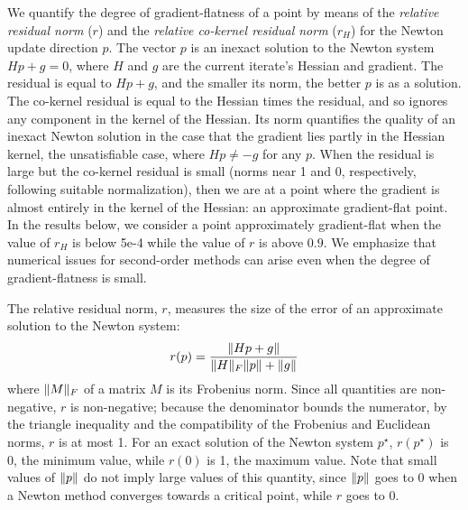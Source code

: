 \documentclass[../../thesis.tex]{subfiles}
\begin{document}
We quantify the degree of gradient-flatness of a point
by means of
the \emph{relative residual norm} ($r$)
and the \emph{relative co-kernel residual norm} ($r_H$)
for the Newton update direction $p$.
The vector $p$ is an inexact solution to the Newton system $Hp + g = 0$,
where $H$ and $g$ are the current iterate's Hessian and gradient.
The residual is equal to $Hp + g$,
and the smaller its norm, the better $p$ is as a solution.
The co-kernel residual is equal to the Hessian times the residual,
and so ignores any component in the kernel of the Hessian.
Its norm quantifies the quality of an inexact Newton solution
in the case that the gradient lies partly in the Hessian kernel,
the unsatisfiable case, where $Hp \neq -g$ for any $p$.
When the residual is large but the co-kernel residual is small
(norms near 1 and 0, respectively, following suitable normalization),
then we are at a point where
the gradient is almost entirely in the kernel of the Hessian:
an approximate gradient-flat point.
In the results below, we consider a point approximately gradient-flat
when the value of $r_H$ is below 5e-4
while the value of $r$ is above $0.9$.
We emphasize that numerical issues for second-order methods
can arise even when the degree of gradient-flatness
is small.

The relative residual norm, $r$,
measures the size of the error
of an approximate solution to the Newton system:
\begin{equation}
    r(p) = \frac{\lVert Hp + g\rVert}{\lVert H\rVert_F \lVert p\rVert + \lVert g\rVert}
\end{equation}
\noindent where $\lVert M\rVert_F$ of a matrix $M$ is its Frobenius norm.
Since all quantities are non-negative,
$r$ is non-negative;
because the denominator bounds the numerator,
by the triangle inequality and the compatibility
of the Frobenius and Euclidean norms,
$r$ is at most 1.
For an exact solution of the Newton system $p^\star$,
$r(p^\star)$ is 0, the minimum value,
while $r(0)$ is 1, the maximum value.
Note that small values of $\lVert p\rVert$
do not imply large values of this quantity,
since $\lVert p\rVert$ goes to 0 when a Newton method
converges towards a critical point,
while $r$ goes to 0.
\end{document}
